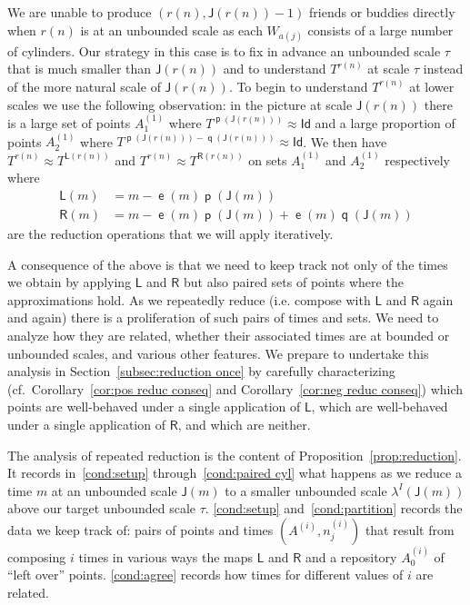 \documentclass[AHL,Unicode,longabstracts,published]{cedram}
\DeclareMathOperator{\lst}{\mathsf{e}}
\DeclareMathOperator{\p}{\mathsf{p}}
\DeclareMathOperator{\q}{\mathsf{q}}
\newcommand{\id}{\mathsf{Id}}
\newcommand{\lft}{\mathsf{L}}
\newcommand{\rht}{\mathsf{R}}
\newcommand{\scl}{\mathsf{J}}
\begin{document}
We are unable to produce $(r(n), \scl(r(n))-1)$ friends or buddies directly when $r(n)$ is at an unbounded scale as each $W_{a(j)}$ consists of a large number of cylinders. Our strategy in this case is to fix in advance an unbounded scale $\tau$ that is much smaller than $\scl(r(n))$ and to understand $T^{r(n)}$ at scale $\tau$ instead of the more natural scale of $\scl(r(n))$. To begin to understand $T^{r(n)}$ at lower scales we use the following observation: in the picture at scale $\scl(r(n))$ there is a large set of points $A^{(1)}_1$ where $T^{\p(\scl(r(n)))} \approx \id$ and a large proportion of points $A^{(1)}_2$ where $T^{\p(\scl(r(n))) - \q(\scl(r(n)))} \approx \id$. We then have $T^{r(n)} \approx T^{\lft(r(n))}$ and $T^{r(n)} \approx T^{\rht(r(n))}$ on sets $A^{(1)}_1$ and $A^{(1)}_2$ respectively where
\begin{align*}
\lft(m) &= m - \lst(m) \p(\scl(m)) \\
\rht(m) &= m - \lst(m) \p(\scl(m)) + \lst(m) \q(\scl(m))
\end{align*}
are the reduction operations that we will apply iteratively.

A consequence of the above is that we need to keep track not only of the times we obtain by applying $\lft$ and $\rht$ but also paired sets of points where the approximations hold. As we repeatedly reduce (i.e. compose with $\lft$ and $\rht$ again and again) there is a proliferation of such pairs of times and sets. We need to analyze how they are related, whether their associated times are at bounded or unbounded scales, and various other features. We prepare to undertake this analysis in Section~\ref{subsec:reduction once} by carefully characterizing (cf.\ Corollary~\ref{cor:pos reduc conseq} and Corollary~\ref{cor:neg reduc conseq}) which points are well-behaved under a single application of $\lft$, which are well-behaved under a single application of $\rht$, and which are neither.

The analysis of repeated reduction is the content of Proposition~\ref{prop:reduction}. It records in~\eqref{cond:setup} through~\eqref{cond:paired cyl} what happens as we reduce a time $m$ at an unbounded scale $\scl(m)$ to a smaller unbounded scale $\lambda^I(\scl(m))$ above our target unbounded scale $\tau$. \eqref{cond:setup} and~\eqref{cond:partition} records the data we keep track of: pairs of points and times $(A^{(i)}, n^{(i)}_j)$ that result from composing $i$ times in various ways the maps $\lft$ and $\rht$ and a repository $A^{(i)}_0$ of ``left over'' points. \eqref{cond:agree} records how times for different values of $i$ are related.
\end{document}

